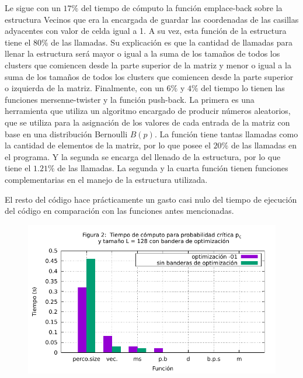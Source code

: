 \documentclass{article}
\begin{document}
\begin{multicols}{2}
Le sigue con un $17\%$ del tiempo de cómputo la función emplace-back sobre la estructura Vecinos que era la encargada de guardar las coordenadas de las casillas adyacentes con valor de celda igual a 1. A su vez, esta función de la estructura tiene el $80\%$ de las llamadas. Su explicación es que la cantidad de llamadas para llenar la estructura será mayor o igual a la suma de los tamaños de todos los clusters que comiencen desde la parte superior de la matriz y menor o igual a la suma de los tamaños de todos los clusters que comiencen desde la parte superior o izquierda de la matriz. Finalmente, con un $6\%$ y $4\%$ del tiempo lo tienen las funciones mersenne-twister y la función push-back. La primera es una herramienta que utiliza un algoritmo encargado de producir números aleatorios, que se utiliza para la asignación de los valores de cada entrada de la matriz con base en una distribución Bernoulli $B(p)$. La función tiene tantas llamadas como la cantidad de elementos de la matriz, por lo que posee el $20\%$ de las llamadas en el programa. Y la segunda se encarga del llenado de la estructura, por lo que tiene el $1.21\%$ de las llamadas. La segunda y la cuarta función tienen funciones complementarias en el manejo de la estructura utilizada.

El resto del código hace prácticamente un gasto casi nulo del tiempo de ejecución del código en comparación con las funciones antes mencionadas.


\end{multicols}{}

\begin{figure}[h!]
    \begin{center}
    \includegraphics[scale=1]{profile0.pdf}
    \end{center}
\end{figure}
\end{document}

